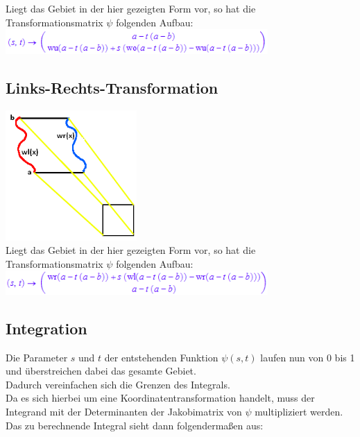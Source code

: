 \documentclass[11pt,final]{scrreprt}
\begin{document}
Liegt das Gebiet in der hier gezeigten Form vor, so hat die Transformationsmatrix $\psi$ folgenden Aufbau:\\

\includegraphics[width=10cm]{images/flaechenintegral/obenUntenTransformation.png}\\

\subsection{Links-Rechts-Transformation}

\includegraphics[width=5cm]{images/flaechenintegral/linksRechtsTransformation2.png}\\

Liegt das Gebiet in der hier gezeigten Form vor, so hat die Transformationsmatrix $\psi$ folgenden Aufbau:\\

\includegraphics[width=10cm]{images/flaechenintegral/linksRechtsTransformation.png}\\

\subsection{Integration}

Die Parameter $s$ und $t$ der entstehenden Funktion $\psi(s, t)$ laufen nun von 0 bis 1 und überstreichen dabei das gesamte Gebiet.\\
Dadurch vereinfachen sich die Grenzen des Integrals.\\
Da es sich hierbei um eine Koordinatentransformation handelt, muss der Integrand mit der Determinanten der Jakobimatrix von $\psi$ multipliziert werden.\\
Das zu berechnende Integral sieht dann folgendermaßen aus:\\
\end{document}
